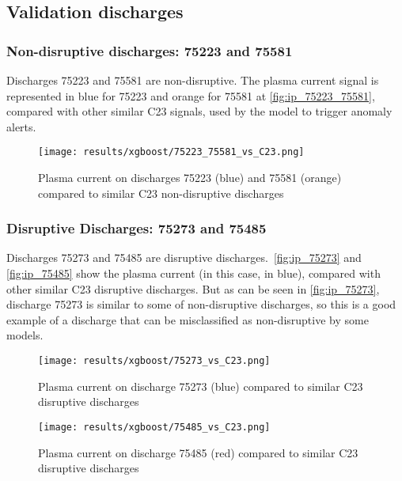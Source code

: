 \subsection{Validation discharges}

\subsubsection{Non-disruptive discharges: 75223 and 75581}

Discharges 75223 and 75581 are non-disruptive. The plasma current signal is represented in blue for 75223 and orange for 75581 at \autoref{fig:ip_75223_75581}, compared with other similar C23 signals, used by the model to trigger anomaly alerts.

\begin{figure}[H]
    \centering
    \texttt{[image: results/xgboost/75223\_75581\_vs\_C23.png]}
    \caption{Plasma current on discharges 75223 (blue) and 75581 (orange) compared to similar C23 non-disruptive discharges}
    \label{fig:ip_75223_75581}
\end{figure}

\subsubsection{Disruptive Discharges: 75273 and 75485}

Discharges 75273 and 75485 are disruptive discharges.\ \autoref{fig:ip_75273} and \autoref{fig:ip_75485} show the plasma current (in this case, in blue), compared with other similar C23 disruptive discharges. But as can be seen in \autoref{fig:ip_75273}, discharge 75273 is similar to some of non-disruptive discharges, so this is a good example of a discharge that can be misclassified as non-disruptive by some models.

\begin{figure}[H]
    \centering
    \texttt{[image: results/xgboost/75273\_vs\_C23.png]}
    \caption{Plasma current on discharge 75273 (blue) compared to similar C23 disruptive discharges}
    \label{fig:ip_75273}
\end{figure}

\begin{figure}[H]
    \centering
    \texttt{[image: results/xgboost/75485\_vs\_C23.png]}
    \caption{Plasma current on discharge 75485 (red) compared to similar C23 disruptive discharges}
    \label{fig:ip_75485}
\end{figure}

